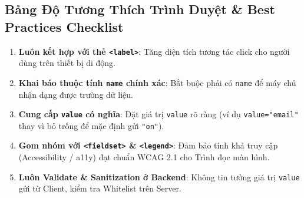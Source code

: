 \documentclass[11pt,oneside]{book}
\newcommand{\thd}[1]{\textcolor{white}{\textbf{\strut #1}}}
\newcommand{\codeinline}[1]{\textcolor{accentOrange}{\texttt{#1}}}
\begin{document}
\subsection{Bảng Độ Tương Thích Trình Duyệt \& Best Practices Checklist}

\begin{prettyTableBox}
\end{prettyTableBox}

\begin{tipBox}
\begin{enumerate}[leftmargin=1.5em, itemsep=2pt, parsep=0pt]
    \item \textbf{Luôn kết hợp với thẻ \codeinline{<label>}}: Tăng diện tích tương tác click cho người dùng trên thiết bị di động.
    \item \textbf{Khai báo thuộc tính \codeinline{name} chính xác}: Bắt buộc phải có \codeinline{name} để máy chủ nhận dạng được trường dữ liệu.
    \item \textbf{Cung cấp \codeinline{value} có nghĩa}: Đặt giá trị \codeinline{value} rõ ràng (ví dụ \codeinline{value="email"} thay vì bỏ trống để mặc định gửi \codeinline{"on"}).
    \item \textbf{Gom nhóm với \codeinline{<fieldset>} \& \codeinline{<legend>}}: Đảm bảo tính khả truy cập (Accessibility / a11y) đạt chuẩn WCAG 2.1 cho Trình đọc màn hình.
    \item \textbf{Luôn Validate \& Sanitization ở Backend}: Không tin tưởng giá trị \codeinline{value} gửi từ Client, kiểm tra Whitelist trên Server.
\end{enumerate}
\end{tipBox}
\end{document}
